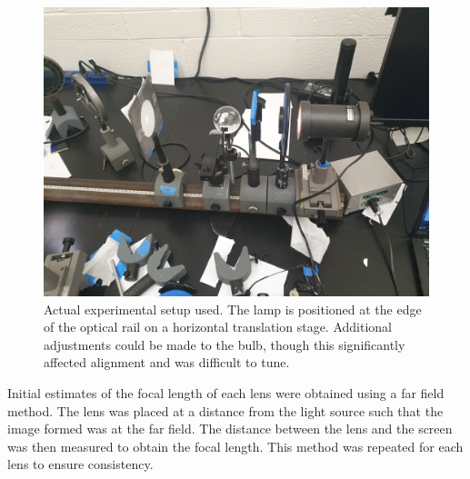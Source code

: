 \documentclass[aip, cp, amsmath, amssymb, reprint, nofootinbib]{revtex4-2}
\begin{document}
        \begin{figure}[H]
            \centering
            \includegraphics[width=0.8\linewidth]{figures/setup.jpeg}
            \caption{Actual experimental setup used. The lamp is positioned at the edge of the optical rail on a horizontal translation stage. Additional adjustments could be made to the bulb, though this significantly affected alignment and was difficult to tune.}
            \label{fig:realsetup}
        \end{figure}

        Initial estimates of the focal length of each lens were obtained using a far field method. The lens was placed at a distance from the light source such that the image formed was at the far field. The distance between the lens and the screen was then measured to obtain the focal length. This method was repeated for each lens to ensure consistency.
\end{document}
